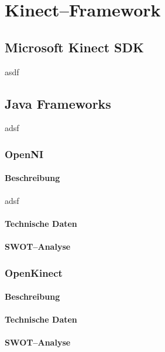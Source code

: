 \chapter{Kinect--Framework}
\label{chap:Kinect}

\section{Microsoft Kinect SDK}
asdf
\section{Java Frameworks}
adsf
\subsection{OpenNI}
\subsubsection{Beschreibung}
adsf
\subsubsection{Technische Daten}
\subsubsection{SWOT--Analyse}

\subsection{OpenKinect}

\subsubsection{Beschreibung}

\subsubsection{Technische Daten}

\subsubsection{SWOT--Analyse}

